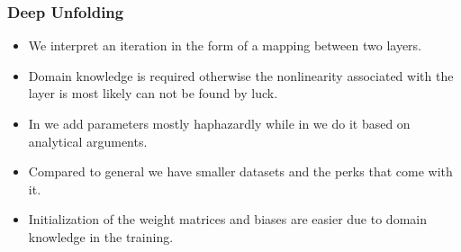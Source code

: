\begin{frame}
  \frametitle{Deep Unfolding}
  \begin{itemize}
    \pause
    \item We interpret an iteration in the form of a mapping between two layers. 
    \pause
    \item Domain knowledge is required otherwise the nonlinearity associated with the layer is most likely can not be found by luck.
    \pause
    \item In \nns we add parameters mostly haphazardly while in \du we do it based on analytical arguments.
    \pause
    \item Compared to general \nns we have smaller datasets and the perks that come with it.
    \pause
    \item Initialization of the weight matrices and biases are easier due to domain knowledge in the training.
  \end{itemize}
\end{frame}
